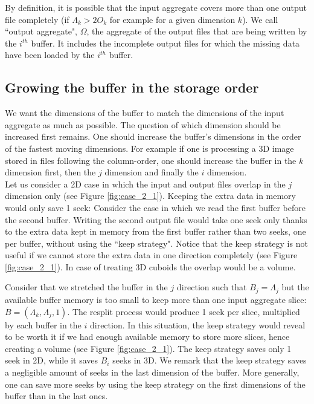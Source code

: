 \documentclass[conference]{IEEEtran}
\begin{document}
By definition, it is possible that the input aggregate covers more than one output file completely (if $\Lambda_k > 2O_k$ for example for a given dimension $k$).
We call ``output aggregate", $\Omega$, the aggregate of the output files that are being written by the $i^{th}$ buffer. It includes the incomplete output files for which the missing data have been loaded by the $i^{th}$ buffer. \\


\subsection{Growing the buffer in the storage order}
We want the dimensions of the buffer to match the dimensions of the input aggregate as much as possible.
The question of which dimension should be increased first remains.
One should increase the buffer's dimensions in the order of the fastest moving dimensions.
For example if one is processing a 3D image stored in files following the column-order, one should increase the buffer in the $k$ dimension first, then the $j$ dimension and finally the $i$ dimension. \\

Let us consider a 2D case in which the input and output files overlap in the $j$ dimension only (see Figure \ref{fig:case_2_1}).
Keeping the extra data in memory would only save 1 seek:
Consider the case in which we read the first buffer before the second buffer.
Writing the second output file would take one seek only thanks to the extra data kept in memory from the first buffer rather than two seeks, one per buffer, without using the ``keep strategy".
Notice that the keep strategy is not useful if we cannot store the extra data in one direction completely (see Figure \ref{fig:case_2_1}).
In case of treating 3D cuboids the overlap would be a volume.

Consider that we stretched the buffer in the $j$ direction such that $B_j = \Lambda_j$ but the available buffer memory is too small to keep more than one input aggregate slice: $B=(\Lambda_k, \Lambda_j, 1)$.
The resplit process would produce 1 seek per slice, multiplied by each buffer in the $i$ direction.
In this situation, the keep strategy would reveal to be worth it if we had enough available memory to store more slices, hence creating a volume (see Figure \ref{fig:case_2_1}).
The keep strategy saves only 1 seek in 2D, while it saves $B_i$ seeks in 3D.
We remark that the keep strategy saves a negligible amount of seeks in the last dimension of the buffer.
More generally, one can save more seeks by using the keep strategy on the first dimensions of the buffer than in the last ones.
\end{document}
